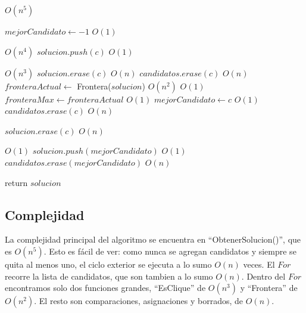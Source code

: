 \begin{algorithm}[H]
\begin{algorithmic}

                 \Comment $O(n^5)$

        \State $mejorCandidato \gets -1$            \Comment $O(1)$

                            \Comment $O(n^4)$
            \State $solucion.push(c)$               \Comment $O(1)$

                                    \Comment $O(n^3)$
                \State $solucion.erase(c)$                          \Comment $O(n)$
                \State $candidatos.erase(c)$                        \Comment $O(n)$
            \Else
                \State $fronteraActual \gets$ Frontera($solucion$)  \Comment $O(n^2)$
                              \Comment $O(1)$
                    \State $fronteraMax \gets fronteraActual$       \Comment $O(1)$
                    \State $mejorCandidato \gets c$                 \Comment $O(1)$
                \Else
                    \State $candidatos.erase(c)$                    \Comment $O(n)$
                \EndIf

                \State $solucion.erase(c)$                          \Comment $O(n)$
            \EndIf
        \EndFor

                                       \Comment $O(1)$
            \State $solucion.push(mejorCandidato)$                  \Comment $O(1)$
            \State $candidatos.erase(mejorCandidato)$               \Comment $O(n)$

        \EndIf
    \EndWhile

    \State return $solucion$

\EndFunction

\end{algorithmic}
\end{algorithm}

\subsection{Complejidad}

La complejidad principal del algoritmo se encuentra en ``ObtenerSolucion()'', que es $O(n^5)$. Esto es fácil de ver: como nunca se agregan candidatos y siempre se quita al menos uno, el ciclo exterior se ejecuta a lo sumo $O(n)$ veces. El $For$ recorre la lista de candidatos, que son tambien a lo sumo $O(n)$. Dentro del $For$ encontramos solo dos funciones grandes, ``EsClique'' de $O(n^3)$ y ``Frontera'' de $O(n^2)$. El resto son comparaciones, asignaciones y borrados, de $O(n)$. \\

